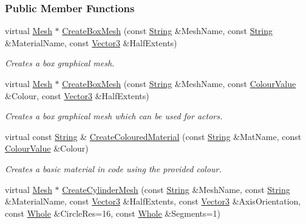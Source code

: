 \subsubsection*{Public Member Functions}
\begin{DoxyCompactItemize}
\item 
virtual \hyperlink{classphys_1_1Mesh}{Mesh} $\ast$ \hyperlink{classphys_1_1MeshManager_a8b79ca0341670d0f2b2139e4028d1f44}{CreateBoxMesh} (const \hyperlink{namespacephys_aa03900411993de7fbfec4789bc1d392e}{String} \&MeshName, const \hyperlink{namespacephys_aa03900411993de7fbfec4789bc1d392e}{String} \&MaterialName, const \hyperlink{classphys_1_1Vector3}{Vector3} \&HalfExtents)
\begin{DoxyCompactList}\small\item\em Creates a box graphical mesh. \item\end{DoxyCompactList}\item 
virtual \hyperlink{classphys_1_1Mesh}{Mesh} $\ast$ \hyperlink{classphys_1_1MeshManager_aedf28abe1205fd18288815e12814abbe}{CreateBoxMesh} (const \hyperlink{namespacephys_aa03900411993de7fbfec4789bc1d392e}{String} \&MeshName, const \hyperlink{classphys_1_1ColourValue}{ColourValue} \&Colour, const \hyperlink{classphys_1_1Vector3}{Vector3} \&HalfExtents)
\begin{DoxyCompactList}\small\item\em Creates a box graphical mesh which can be used for actors. \item\end{DoxyCompactList}\item 
virtual const \hyperlink{namespacephys_aa03900411993de7fbfec4789bc1d392e}{String} \& \hyperlink{classphys_1_1MeshManager_a84becb455df5ca733e1e1c5ce0b2322b}{CreateColouredMaterial} (const \hyperlink{namespacephys_aa03900411993de7fbfec4789bc1d392e}{String} \&MatName, const \hyperlink{classphys_1_1ColourValue}{ColourValue} \&Colour)
\begin{DoxyCompactList}\small\item\em Creates a basic material in code using the provided colour. \item\end{DoxyCompactList}\item 
virtual \hyperlink{classphys_1_1Mesh}{Mesh} $\ast$ \hyperlink{classphys_1_1MeshManager_a54baf240a29b9f9e5d83ae1e8ffdcff4}{CreateCylinderMesh} (const \hyperlink{namespacephys_aa03900411993de7fbfec4789bc1d392e}{String} \&MeshName, const \hyperlink{namespacephys_aa03900411993de7fbfec4789bc1d392e}{String} \&MaterialName, const \hyperlink{classphys_1_1Vector3}{Vector3} \&HalfExtents, const \hyperlink{classphys_1_1Vector3}{Vector3} \&AxisOrientation, const \hyperlink{namespacephys_a460f6bc24c8dd347b05e0366ae34f34a}{Whole} \&CircleRes=16, const \hyperlink{namespacephys_a460f6bc24c8dd347b05e0366ae34f34a}{Whole} \&Segments=1)

\end{DoxyCompactItemize}
